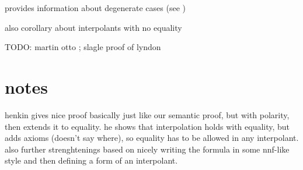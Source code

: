 provides information about  degenerate cases (see \cite{})

also corollary about interpolants with no equality


TODO: martin otto ; slagle proof of lyndon




\section*{notes}

henkin gives nice proof basically just like our semantic proof, but with polarity, then extends it to equality.
he shows that interpolation holds with equality, but adds axioms (doesn't say where), so equality has to be allowed in any interpolant.
also further strenghtenings based on nicely writing the formula in some nnf-like style and then defining a form of an interpolant.

